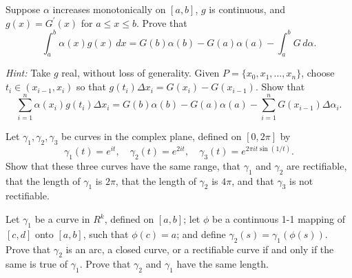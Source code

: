   \begin{exercise}[Rudin 6.17]
    Suppose $\alpha$ increases monotonically on $[a, b]$, $g$ is continuous, and $g(x) = G^\prime(x)$ for $a \le x \le b$. Prove that
    \begin{equation}
      \int_a^b \alpha(x) g(x) \, dx = G(b)\alpha(b) - G(a)\alpha(a) - \int_a^b G \, d\alpha.
    \end{equation}
    \par \textit{Hint:} Take $g$ real, without loss of generality. Given $P = \{x_0, x_1, \dots, x_n\}$, choose $t_i \in (x_{i-1}, x_i)$ so that $g(t_i) \Delta x_i = G(x_i) - G(x_{i-1})$. Show that
    \begin{equation}
      \sum_{i=1}^n \alpha(x_i) g(t_i) \Delta x_i = G(b)\alpha(b) - G(a)\alpha(a) - \sum_{i=1}^n G(x_{i-1}) \Delta \alpha_i.
    \end{equation}
  \end{exercise}
  \begin{solution}

  \end{solution}

  \begin{exercise}[Rudin 6.18]
    Let $\gamma_1, \gamma_2, \gamma_3$ be curves in the complex plane, defined on $[0, 2\pi]$ by
    \begin{equation}
      \gamma_1(t) = e^{it}, \quad \gamma_2(t) = e^{2it}, \quad \gamma_3(t) = e^{2\pi it \sin(1/t)}.
    \end{equation}
    Show that these three curves have the same range, that $\gamma_1$ and $\gamma_2$ are rectifiable, that the length of $\gamma_1$ is $2\pi$, that the length of $\gamma_2$ is $4\pi$, and that $\gamma_3$ is not rectifiable.
  \end{exercise}
  \begin{solution}

  \end{solution}

  \begin{exercise}[Rudin 6.19]
    Let $\gamma_1$ be a curve in $R^k$, defined on $[a, b]$; let $\phi$ be a continuous 1-1 mapping of $[c, d]$ onto $[a, b]$, such that $\phi(c) = a$; and define $\gamma_2(s) = \gamma_1(\phi(s))$. Prove that $\gamma_2$ is an arc, a closed curve, or a rectifiable curve if and only if the same is true of $\gamma_1$. Prove that $\gamma_2$ and $\gamma_1$ have the same length.
  \end{exercise}
  \begin{solution}

  \end{solution}
